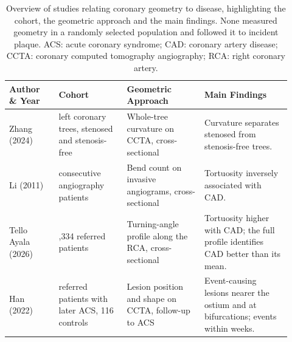 \begin{table}[htbp]
  \centering
  \footnotesize
  \begin{tabular}{@{}>{\raggedright\arraybackslash}p{0.16\linewidth}%
                  >{\raggedright\arraybackslash}p{0.22\linewidth}%
                  >{\raggedright\arraybackslash}p{0.25\linewidth}%
                  >{\raggedright\arraybackslash}p{0.29\linewidth}@{}}
    \toprule
    Author \& Year & Cohort & Geometric Approach & Main Findings \\
    \midrule
    Zhang (2024) & 39 left coronary trees, stenosed and stenosis-free
      & Whole-tree curvature on CCTA, cross-sectional
      & Curvature separates stenosed from stenosis-free trees. \\
    Li (2011) & 1010 consecutive angiography patients
      & Bend count on invasive angiograms, cross-sectional
      & Tortuosity inversely associated with CAD. \\
    Tello Ayala (2026) & 22,334 referred patients
      & Turning-angle profile along the RCA, cross-sectional
      & Tortuosity higher with CAD; the full profile identifies CAD better than its mean. \\
    Han (2022) & 116 referred patients with later ACS, 116 controls
      & Lesion position and shape on CCTA, follow-up to ACS
      & Event-causing lesions nearer the ostium and at bifurcations; events within weeks. \\
    \bottomrule
  \end{tabular}
  \caption{Overview of studies relating coronary geometry to disease, highlighting the cohort, the
    geometric approach and the main findings. None measured geometry in a randomly selected
    population and followed it to incident plaque. ACS: acute coronary syndrome; CAD: coronary artery
    disease; CCTA: coronary computed tomography angiography; RCA: right coronary artery.}
  \label{tab:literature}
\end{table}

